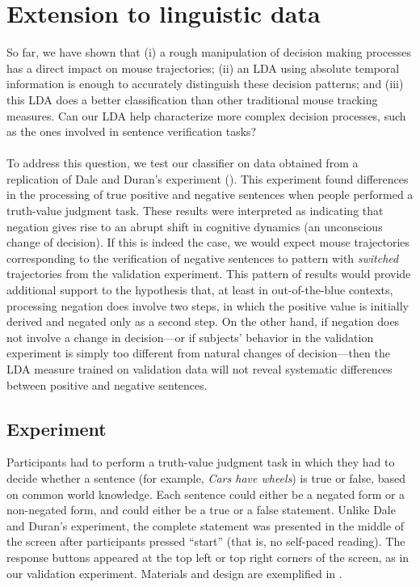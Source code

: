 \documentclass[11pt]{article}
\begin{document}
\section{Extension to linguistic data}
\label{section:replication}
So far, we have shown that (i) a rough manipulation of decision making processes has a direct impact on mouse trajectories; (ii) an LDA using absolute temporal information is enough to accurately distinguish these decision patterns; and (iii) this LDA does a better classification than other traditional mouse tracking measures. Can our LDA help characterize more complex decision processes, such as the ones involved in sentence verification tasks? 

\paragraph{}
To address this question, we test our classifier on data obtained from a replication of Dale and Duran's experiment (\citeyear{Dale2011}).   
This experiment found differences in the processing of true positive and negative sentences when people performed a truth-value judgment task. These results were interpreted as indicating that negation gives rise to an abrupt shift in cognitive dynamics (an unconscious change of decision). If this is indeed the case, we would expect mouse trajectories corresponding to the verification of negative sentences to pattern with \emph{switched} trajectories from the validation experiment. This pattern of results would provide additional support to the hypothesis that, at least in out-of-the-blue contexts, processing negation does involve two steps, in which the positive value is initially derived and negated only as a second step.
On the other hand, if negation does not involve a change in decision---or if subjects' behavior in the validation experiment is simply too different from natural changes of decision---then the LDA measure trained on validation data will not reveal systematic differences between positive and negative sentences.


\subsection{Experiment}
Participants had to perform a truth-value judgment task in which they had to decide whether a sentence (for example, \textit{Cars have wheels}) is true or false, based on common world knowledge. Each sentence could either be a negated form or a non-negated form, and could either be a true or a false statement.
Unlike Dale and Duran's experiment, the complete statement was presented in the middle of the screen after participants pressed ``start'' (that is, no self-paced reading). The response buttons appeared at the top left or top right corners of the screen, as in our validation experiment.  
Materials and design are exemplified in . 
\end{document}
